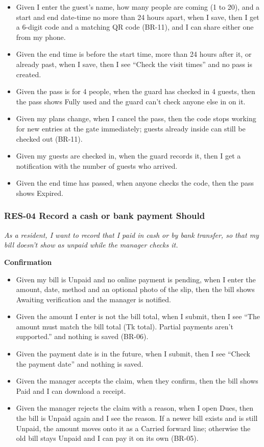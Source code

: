 \documentclass[11pt,a4paper]{report}
\newcommand{\taka}{Tk}
\newcommand{\taka}{{\bnfont\char"09F3}}
\begin{document}
\begin{itemize}
  \item Given I enter the guest's name, how many people are coming (1 to 20), and a start and end date-time no more than 24 hours apart, when I save, then I get a 6-digit code and a matching QR code (BR-11), and I can share either one from my phone.
  \item Given the end time is before the start time, more than 24 hours after it, or already past, when I save, then I see ``Check the visit times'' and no pass is created.
  \item Given the pass is for 4 people, when the guard has checked in 4 guests, then the pass shows Fully used and the guard can't check anyone else in on it.
  \item Given my plans change, when I cancel the pass, then the code stops working for new entries at the gate immediately; guests already inside can still be checked out (BR-11).
  \item Given my guests are checked in, when the guard records it, then I get a notification with the number of guests who arrived.
  \item Given the end time has passed, when anyone checks the code, then the pass shows Expired.
\end{itemize}

\subsubsection*{RES-04 \textperiodcentered{} Record a cash or bank payment \textperiodcentered{} Should}

\emph{As a resident, I want to record that I paid in cash or by bank transfer, so that my bill doesn't show as unpaid while the manager checks it.}

\medskip\noindent\textbf{Confirmation}\par

\begin{itemize}
  \item Given my bill is Unpaid and no online payment is pending, when I enter the amount, date, method and an optional photo of the slip, then the bill shows Awaiting verification and the manager is notified.
  \item Given the amount I enter is not the bill total, when I submit, then I see ``The amount must match the bill total (\taka{} total). Partial payments aren't supported.'' and nothing is saved (BR-06).
  \item Given the payment date is in the future, when I submit, then I see ``Check the payment date'' and nothing is saved.
  \item Given the manager accepts the claim, when they confirm, then the bill shows Paid and I can download a receipt.
  \item Given the manager rejects the claim with a reason, when I open Dues, then the bill is Unpaid again and I see the reason. If a newer bill exists and is still Unpaid, the amount moves onto it as a Carried forward line; otherwise the old bill stays Unpaid and I can pay it on its own (BR-05).
\end{itemize}
\end{document}

